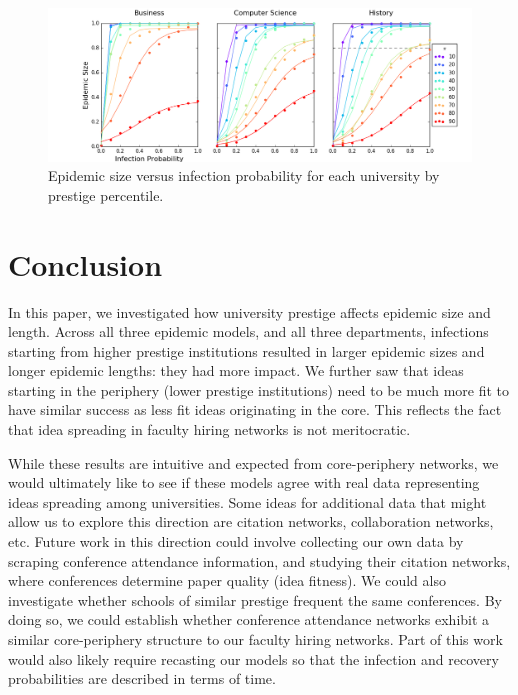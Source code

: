 \documentclass[%
 reprint,
 amsmath,amssymb,
 aps,
]{revtex4-1}
\begin{document}
\begin{figure}
	\centering
  \includegraphics[width=\textwidth]{figures/infectious-size-results-of-ALL-SI.png}
  \caption{Epidemic size versus infection probability for each university by prestige percentile.}
  \label{SI-infection-size}
\end{figure}

\section{\label{sec:level1}Conclusion}

In this paper, we investigated how university prestige affects epidemic size and length. Across all three epidemic models, and all three departments, infections starting from higher prestige institutions resulted in larger epidemic sizes and longer epidemic lengths: they had more impact. We further saw that ideas starting in the periphery (lower prestige institutions) need to be much more fit to have similar success as less fit ideas originating in the core. This reflects the fact that idea spreading in faculty hiring networks is not meritocratic.

While these results are intuitive and expected from core-periphery networks, we would ultimately like to see if these models agree with real data representing ideas spreading among universities. Some ideas for additional data that might allow us to explore this direction are citation networks, collaboration networks, etc. Future work in this direction could involve collecting our own data by scraping conference attendance information, and studying their citation networks, where conferences determine paper quality (idea fitness). We could also investigate whether schools of similar prestige frequent the same conferences. By doing so, we could establish whether conference attendance networks exhibit a similar core-periphery structure to our faculty hiring networks. Part of this work would also likely require recasting our models so that the infection and recovery probabilities are described in terms of time.
\end{document}
